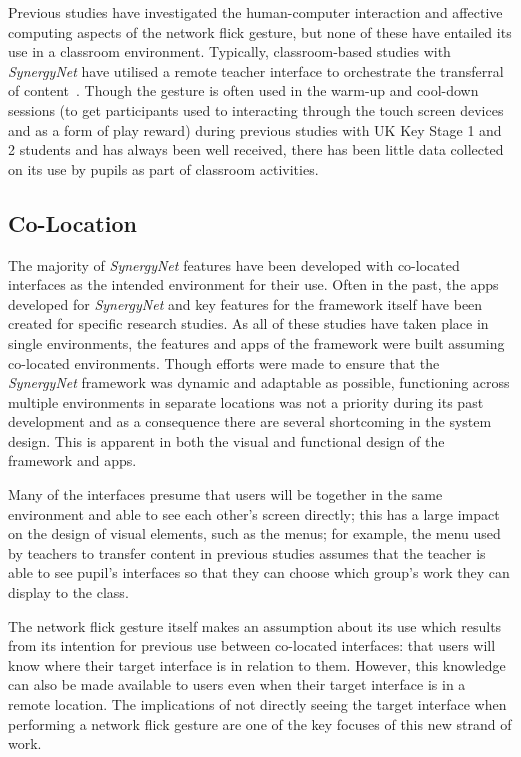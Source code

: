 \documentclass[twocolumn]{svjour3}          %
\begin{document}
Previous studies have investigated the human-computer interaction and affective computing aspects of the network flick gesture, but none of these have entailed its use in a classroom environment.
Typically, classroom-based studies with {\emph{SynergyNet}} have utilised a remote teacher interface to orchestrate the transferral of content~\citep{joycegibbons:2016}.
Though the gesture is often used in the warm-up and cool-down sessions (to get participants used to interacting through the touch screen devices and as a form of play reward) during previous studies with UK Key Stage 1 and 2 students and has always been well received, there has been little data collected on its use by pupils as part of classroom activities.

\subsection{Co-Location}

The majority of {\emph{SynergyNet}} features have been developed with co-located interfaces as the intended environment for their use.
Often in the past, the apps developed for {\emph{SynergyNet}} and key features for the framework itself have been created for specific research studies.
As all of these studies have taken place in single environments, the features and apps of the framework were built assuming co-located environments.
Though efforts were made to ensure that the {\emph{SynergyNet}} framework was dynamic and adaptable as possible, functioning across multiple environments in separate locations was not a priority during its past development and as a consequence there are several shortcoming in the system design.
This is apparent in both the visual and functional design of the framework and apps.

Many of the interfaces presume that users will be together in the same environment and able to see each other's screen directly; this has a large impact on the design of visual elements, such as the menus; for example, the menu used by teachers to transfer content in previous studies assumes that the teacher is able to see pupil's interfaces so that they can choose which group's work they can display to the class.

The network flick gesture itself makes an assumption about its use which results from its intention for previous use between co-located interfaces: that users will know where their target interface is in relation to them.
However, this knowledge can also be made available to users even when their target interface is in a remote location.
The implications of not directly seeing the target interface when performing a network flick gesture are one of the key focuses of this new strand of work.
\end{document}
